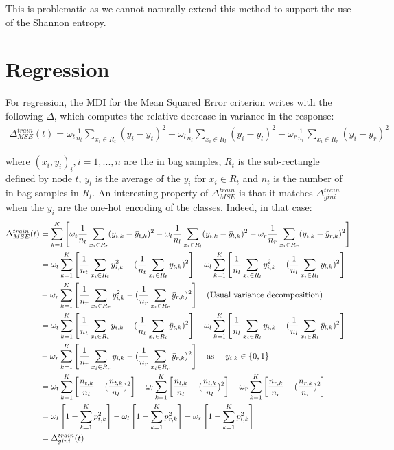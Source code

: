 \documentclass{article}
\begin{document}
This is problematic as we cannot naturally extend this method to support the use of the Shannon entropy.
\section{Regression}
For regression, the MDI for the Mean Squared Error criterion writes with the following $\Delta$, which computes the relative decrease in variance in the response:
\begin{align*}
    \Delta_{MSE}^{train}(t) = \omega_t \frac{1}{n_t} \sum_{x_i \in R_t}(y_i - \bar{y}_t)^2 - \omega_l \frac{1}{n_l} \sum_{x_i \in R_l}(y_i - \bar{y}_l)^2 - \omega_r \frac{1}{n_r} \sum_{x_i \in R_r}(y_i - \bar{y}_r)^2
\end{align*}

where $(x_i,y_i)_i, i = 1, ...,n$ are the in bag samples, $R_t$ is the sub-rectangle defined by node $t$, $\bar{y_t}$ is the average of the $y_i$ for $x_i\in R_t$ and $n_t$ is the number of in bag samples in $R_t$.
An interesting property of $\Delta_{MSE}^{train}$ is that it matches $\Delta_{gini}^{train}$ when the $y_i$ are the one-hot encoding of the classes. Indeed, in that case:
\begin{align*}
    \Delta_{MSE}^{train}(t) &= \sum_{k=1}^K \left[\omega_t \frac{1}{n_t} \sum_{x_i \in R_t}(y_{i,k} - \bar{y}_{t,k})^2 - \omega_l \frac{1}{n_l} \sum_{x_i \in R_l}(y_{i,k} - \bar{y}_{l,k})^2 - \omega_r \frac{1}{n_r} \sum_{x_i \in R_r}(y_{i,k} - \bar{y}_{r,k})^2\right]\\
    &= \omega_t \sum_{k=1}^K \left[\frac{1}{n_t} \sum_{x_i \in R_t}y^{2}_{i,k} - (\frac{1}{n_t} \sum_{x_i \in R_t}\bar{y}_{t,k})^2\right] 
    - \omega_l \sum_{k=1}^K  \left[\frac{1}{n_l} \sum_{x_i \in R_l}y^{2}_{i,k} - (\frac{1}{n_l} \sum_{x_i \in R_l}\bar{y}_{l,k})^2\right] \\
    & - \omega_r \sum_{k=1}^K  \left[\frac{1}{n_r} \sum_{x_i \in R_r}y^{2}_{i,k} - (\frac{1}{n_r} \sum_{x_i \in R_r}\bar{y}_{r,k})^2\right] \text{\quad(Usual variance decomposition)}\\
    &= \omega_t \sum_{k=1}^K \left[\frac{1}{n_t} \sum_{x_i \in R_t}y_{i,k} - (\frac{1}{n_t} \sum_{x_i \in R_t}\bar{y}_{t,k})^2\right] 
    - \omega_l \sum_{k=1}^K  \left[\frac{1}{n_l} \sum_{x_i \in R_l}y_{i,k} - (\frac{1}{n_l} \sum_{x_i \in R_l}\bar{y}_{l,k})^2\right] \\
    &- \omega_r \sum_{k=1}^K  \left[\frac{1}{n_r} \sum_{x_i \in R_r}y_{i,k} - (\frac{1}{n_r} \sum_{x_i \in R_r}\bar{y}_{r,k})^2\right] \text{\quad as \quad $y_{i,k} \in \{0,1\}$} \\
    &=  \omega_t \sum_{k=1}^K \left[\frac{n_{t,k}}{n_t}  - (\frac{n_{t,k}}{n_t})^2\right] 
    - \omega_l \sum_{k=1}^K \left[\frac{n_{l,k}}{n_l}  - (\frac{n_{l,k}}{n_l})^2\right] 
    - \omega_r \sum_{k=1}^K \left[\frac{n_{r,k}}{n_r}  - (\frac{n_{r,k}}{n_r})^2\right] \\
    &= \omega_t \left[1 - \sum_{k=1}^K p_{t,k}^2\right] 
    - \omega_l \left[1 - \sum_{k=1}^K p_{r,k}^2\right]
    - \omega_r \left[1 - \sum_{k=1}^K p_{l,k}^2\right] \\
    &= \Delta_{gini}^{train}(t)
\end{align*}
\end{document}
